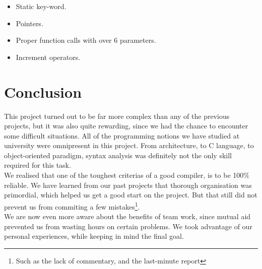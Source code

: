 \documentclass{article}
\begin{document}
\begin{itemize}
\item Static key-word.
\item Pointers.
\item Proper function calls with over 6 parameters.
\item Increment operators.
\end{itemize}

\section{Conclusion}
This project turned out to be far more complex than any of the previous projects, but it was also quite rewarding, since we had the chance to encounter some difficult situations. All of the programming notions we have studied at university were omnipresent in this project. From architecture, to C language, to object-oriented paradigm, syntax analysis was definitely not the only skill required for this task.\\

We realised that one of the toughest criterias of a good compiler, is to be 100\% reliable.
We have learned from our past projects that thorough organisation was primordial, which helped us get a good start on the project. But that still did not prevent us from commiting a few mistakes\footnote{Such as the lack of commentary, and the last-minute report}.\\

We are now even more aware about the benefits of team work, since mutual aid prevented us from wasting hours on certain problems. We took advantage of our personal experiences, while keeping in mind the final goal.
\end{document}
